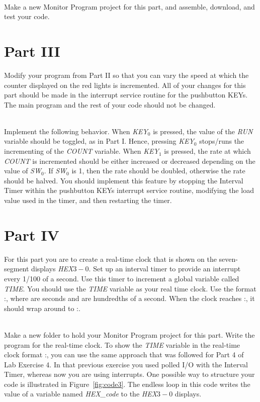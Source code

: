 \documentclass[epsfig,10pt,fullpage]{article}
\begin{document}
~\\
Make a new Monitor Program project for this part, and assemble, download, and test your
code.


\section*{ Part III}
Modify your program from Part II so that you can vary the speed at which the counter
displayed on the red lights is incremented. All of your changes for this part should be made
in the interrupt service routine for the pushbutton KEYs. The main program and the rest of
your code should not be changed.

~\\
Implement the following behavior. When {\it KEY}$_0$ is pressed, the value of the {\it RUN}
variable should be toggled, as in Part I. Hence, pressing {\it KEY}$_0$ stops/runs
the incrementing of the {\it COUNT} variable. When {\it KEY}$_1$ is pressed, the rate at which
{\it COUNT} is incremented should be either increased or decreased depending on the value of {\it SW}$_0$.
If {\it SW}$_0$ is 1, then the rate should be doubled, otherwise the
rate should be halved. You should implement this feature by stopping the Interval Timer within
the pushbutton KEYs interrupt service routine, modifying the load value used in the
timer, and then restarting the timer.

\section*{ Part IV}
For this part you are to create a real-time clock that is shown on the seven-segment displays {\it HEX}$3-0$.
Set up an interval timer to provide an interrupt every 1/100 of a second. Use this
timer to increment a global variable called {\it TIME}. You should use the {\it TIME} variable as your real time clock.
Use the format :, where  are seconds and  are hundredths of a second.
When the clock reaches :, it should wrap around to :.

~\\
Make a new folder to hold your Monitor Program project for this part. Write the program for the
real-time clock. To show the {\it TIME} variable in the real-time clock format
:, you can use the same approach that was followed for Part 4 of Lab Exercise 4.
In that previous exercise you used polled I/O with the Interval Timer,
whereas now you are using interrupts. One possible way to structure your code is illustrated in
Figure~\ref{fig:code3}. The endless loop in this code writes the value of a variable named
{\it HEX\_code} to the {\it HEX}$3-0$ displays.
\end{document}
